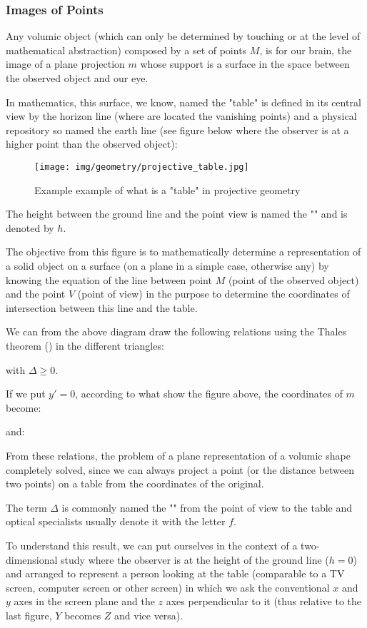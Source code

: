 	\pagebreak
	\subsubsection{Images of Points}
	Any volumic object (which can only be determined by touching or at the level of mathematical abstraction) composed by a set of points $M$, is for our brain, the image of a plane projection $m$ whose support is a surface in the space between the observed object and our eye.
	
	In mathematics, this surface, we know, named the "table" is defined in its central view by the horizon line (where are located the vanishing points) and a physical repository so named the earth line (see figure below where the observer is at a higher point than the observed object):
	\begin{figure}[H]
		\centering
		\texttt{[image: img/geometry/projective\_table.jpg]}
		\caption{Example example of what is a "table" in projective geometry}
	\end{figure}
	The height between the ground line and the point view is named the "" and is denoted by $h$.
	
	The objective from this figure is to mathematically determine a representation of a solid object on a surface (on a plane in a simple case, otherwise any) by knowing the equation of the line between point $M$ (point of the observed object) and the point $V$ (point of view) in the purpose to determine the coordinates of intersection between this line and the table.

	We can from the above diagram draw the following relations using the Thales theorem () in the different triangles:
	
	with $\Delta\geq 0$.

	If we put $y'=0$, according to what show the figure above, the coordinates of $m$ become:
	
	and:
	
	From these relations, the problem of a plane representation of a volumic shape completely solved, since we can always project a point (or the distance between two points) on a table from the coordinates of the original.
	
	The term $\Delta$ is commonly named the "" from the point of view to the table and optical specialists usually denote it with the letter $f$.

	To understand this result, we can put ourselves in the context of a two-dimensional study where the observer is at the height of the ground line ($h = 0$) and arranged to represent a person looking at the table (comparable to a TV screen, computer screen or other screen) in which we ask the conventional $x$ and $y$ axes in the screen plane and the $z$ axes perpendicular to it (thus relative to the last figure, $Y$ becomes $Z$ and vice versa).

